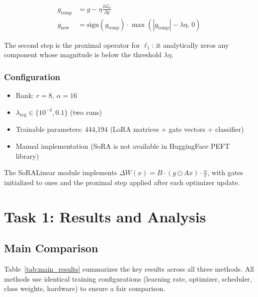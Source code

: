 \documentclass[12pt,a4paper]{article}
\theoremstyle{definition}
\begin{document}
\begin{align}
g_{\text{temp}} &= g - \eta \frac{\partial \mathcal{L}_0}{\partial g} \\
g_{\text{new}} &= \text{sign}(g_{\text{temp}}) \cdot \max\!\left(|g_{\text{temp}}| - \lambda\eta,\, 0\right)
\end{align}

The second step is the proximal operator for $\ell_1$: it analytically zeros any component whose magnitude is below the threshold $\lambda\eta$.

\subsubsection{Configuration}

\begin{itemize}
    \item Rank: $r = 8$, $\alpha = 16$
    \item $\lambda_{\text{reg}} \in \{10^{-4}, 0.1\}$ (two runs)
    \item Trainable parameters: 444,194 (LoRA matrices + gate vectors + classifier)
    \item Manual implementation (SoRA is not available in HuggingFace PEFT library)
\end{itemize}

The SoRALinear module implements $\Delta W(x) = B \cdot (g \odot Ax) \cdot \frac{\alpha}{r}$, with gates initialized to ones and the proximal step applied after each optimizer update.

\section{Task 1: Results and Analysis}

\subsection{Main Comparison}

Table~\ref{tab:main_results} summarizes the key results across all three methods. All methods use identical training configurations (learning rate, optimizer, scheduler, class weights, hardware) to ensure a fair comparison.
\end{document}
